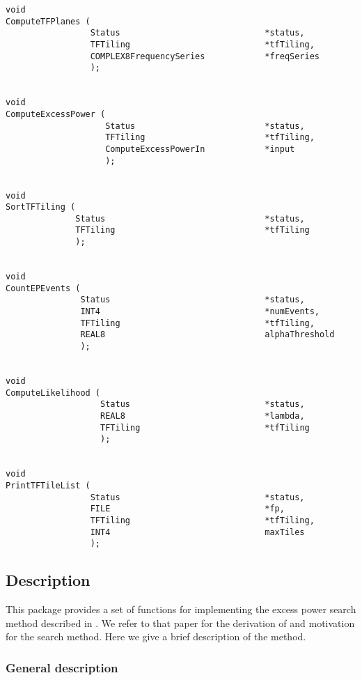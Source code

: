 \documentclass{article}
\begin{document}
\begin{verbatim}
void
ComputeTFPlanes (
                 Status                             *status,
                 TFTiling                           *tfTiling,
                 COMPLEX8FrequencySeries            *freqSeries
                 );


void
ComputeExcessPower (
                    Status                          *status,
                    TFTiling                        *tfTiling,
                    ComputeExcessPowerIn            *input
                    );


void
SortTFTiling (
              Status                                *status,
              TFTiling                              *tfTiling
              );


void
CountEPEvents (
               Status                               *status,
               INT4                                 *numEvents,
               TFTiling                             *tfTiling,
               REAL8                                alphaThreshold
               );


void
ComputeLikelihood (
                   Status                           *status,
                   REAL8                            *lambda,
                   TFTiling                         *tfTiling
                   );


void 
PrintTFTileList (
                 Status                             *status,
                 FILE                               *fp,
                 TFTiling                           *tfTiling,
                 INT4                               maxTiles
                 );
\end{verbatim}





\subsection{Description}

This package provides a set of functions for implementing the excess
power search method described in \cite{abcf:2000}.  We refer to
that paper for the derivation of and motivation for the search method.
Here we give a brief description of the method.

\subsubsection{General description}
\end{document}
